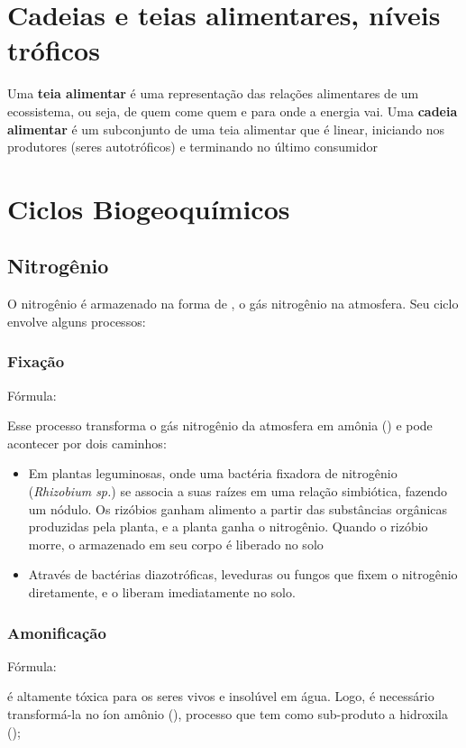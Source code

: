 \documentclass{article}
\begin{document}
\section{Cadeias e teias alimentares, níveis tróficos}
Uma \textbf{teia alimentar} é uma representação das relações alimentares de um ecossistema, ou seja, de quem come quem e para onde a energia vai. Uma \textbf{cadeia alimentar} é um subconjunto de uma teia alimentar que é linear, iniciando nos produtores (seres autotróficos) e terminando no último consumidor 

\section{Ciclos Biogeoquímicos}
\subsection{Nitrogênio}
O nitrogênio é armazenado na forma de , o gás nitrogênio na atmosfera. Seu ciclo envolve alguns processos:

\subsubsection{Fixação} 
Fórmula: 

Esse processo transforma o gás nitrogênio da atmosfera em amônia () e pode acontecer por dois caminhos:

\begin{itemize}
    \item{
        Em plantas leguminosas, onde uma bactéria fixadora de nitrogênio (\textit{Rhizobium sp.}) se associa a suas raízes em uma relação simbiótica, fazendo um nódulo. Os rizóbios ganham alimento a partir das substâncias orgânicas produzidas pela planta, e a planta ganha o nitrogênio. Quando o rizóbio morre, o  armazenado em seu corpo é liberado no solo
    }

    \item {
        Através de bactérias diazotróficas, leveduras ou fungos que fixem o nitrogênio diretamente, e o liberam imediatamente no solo.
    }
\end{itemize}

\subsubsection{Amonificação} 
Fórmula: 

 é altamente tóxica para os seres vivos e insolúvel em água. Logo, é necessário transformá-la no íon amônio (), processo que tem como sub-produto a hidroxila ();
\end{document}
